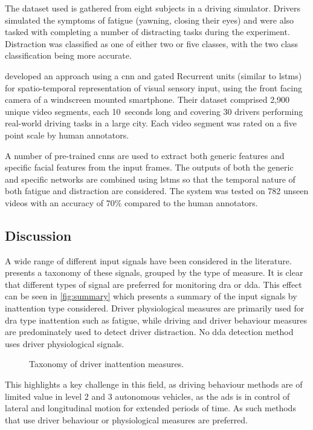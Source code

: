 \documentclass[11pt, parskip=half*,twoside=false]{scrbook}
\begin{document}
The dataset used is gathered from eight subjects in a driving simulator. Drivers simulated the symptoms of fatigue (yawning, closing their eyes) and were also tasked with completing a number of distracting tasks during the experiment. Distraction was classified as one of either two or five classes, with the two class classification being more accurate.

\citet{duaAutoRateHowAttentive2019} developed an approach using a \gls{cnn} and gated Recurrent units (similar to \glspl{lstm}) for spatio-temporal representation of visual sensory input, using the front facing camera of a windscreen mounted smartphone. Their dataset comprised 2,900 unique video segments, each 10~seconds long and covering 30 drivers performing real-world driving tasks in a large city. Each video segment was rated on a five point scale by human annotators. 

A number of pre-trained \glspl{cnn} are used to extract both generic features and specific facial features from the input frames. The outputs of both the generic and specific networks are combined using \glspl{lstm} so that the temporal nature of both fatigue and distraction are considered. The system was tested on 782 unseen videos with an accuracy of $70\%$ compared to the human annotators.

\subsection{Discussion} \label{ssec:analysis}
A wide range of different input signals have been considered in the literature.  presents a taxonomy of these signals, grouped by the type of measure. It is clear that different types of signal are preferred for monitoring \gls{dra} or \gls{dda}. This effect can be seen in \cref{fig:summary} which presents a summary of the input signals by inattention type considered. Driver physiological measures are primarily used for \gls{dra} type inattention such as fatigue, while driving and driver behaviour measures are predominately used to detect driver distraction. No \gls{dda} detection method uses driver physiological signals. 

\begin{figure}[h]
	\centering
	
	\caption{Taxonomy of driver inattention measures.}
	\label{fig:taxonomy_measures}
\end{figure}

This highlights a key challenge in this field, as driving behaviour methods are of limited value in level 2 and 3 autonomous vehicles, as the \gls{ads} is in control of lateral and longitudinal motion for extended periods of time. As such methods that use driver behaviour or physiological measures are preferred.
\end{document}
